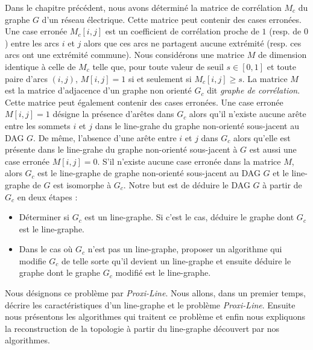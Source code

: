 Dans le chapitre pr\'ec\'edent, nous avons d\'etermin\'e la matrice de corr\'elation $M_c$ du graphe $G$ d'un r\'eseau \'electrique. Cette matrice peut contenir des cases erron\'ees. Une case erron\'ee  $M_c[i,j]$ est un coefficient de corr\'elation proche de $1$ (resp. de $0$) entre les arcs $i$ et $j$ alors que ces arcs ne partagent aucune extr\'emit\'e (resp. ces arcs ont une extr\'emit\'e commune).
\newline
Nous consid\'erons une matrice $M$ de dimension identique \`a celle de $M_c$ telle que, pour toute valeur de seuil $s \in [0,1]$ et toute paire d'arcs $(i,j)$, $M[i,j] = 1$ si et seulement si $M_c[i,j] \ge s$. La matrice $M$ est la matrice d'adjacence d'un graphe non orient\'e $G_c$ dit {\em graphe de corr\'elation}. Cette matrice peut \'egalement contenir des cases erron\'ees.  
Une case erron\'ee $M[i,j] = 1$ d\'esigne la pr\'esence d'ar\^etes dans $G_c$ alors qu'il n'existe aucune ar\^ete entre les sommets $i$ et $j$ dans le line-grahe du graphe non-orient\'e sous-jacent au DAG $G$. 
De m\^eme, l'absence d'une ar\^ete entre $i$ et $j$ dans $G_c$ alors qu'elle est pr\'esente dans le line-grahe du graphe non-orient\'e sous-jacent \`a $G$ est aussi une case erron\'ee  $M[i,j] = 0$.
\newline 
S'il n'existe aucune case erron\'ee dans la matrice $M$, alors $G_c$ est le line-graphe de graphe non-orient\'e sous-jacent au DAG $G$ et le line-graphe de $G$ est isomorphe \`a $G_c$.
Notre but est de d\'eduire le DAG $G$ \`a partir de $G_c$ en deux \'etapes :
\begin{itemize}
	\item D\'eterminer si $G_c$ est un line-graphe. Si c'est  le cas, d\'eduire le graphe dont $G_c$ est le line-graphe.
	\item Dans le cas o\`u $G_c$ n'est pas un line-graphe, proposer un algorithme qui modifie $G_c$ de telle sorte qu'il devient un line-graphe et ensuite d\'eduire le graphe dont le graphe $G_c$ modifi\'e est le line-graphe.
\end{itemize}
 Nous d\'esignons ce probl\`eme par {\em Proxi-Line}.
\newline
Nous allons, dans un premier temps, d\'ecrire les caract\'eristiques d'un line-graphe et le probl\`eme {\em Proxi-Line}. Ensuite nous pr\'esentons les algorithmes qui traitent ce probl\`eme et enfin nous expliquons la reconstruction de la topologie \`a partir du line-graphe d\'ecouvert par nos algorithmes. 
